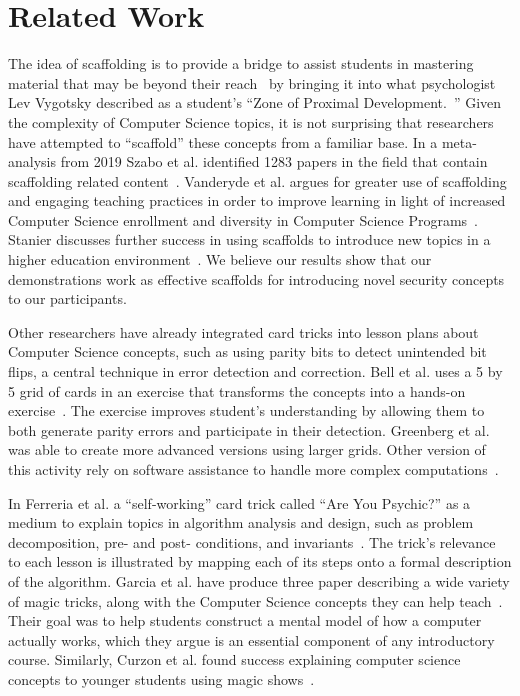 \section{Related Work}
\label{SEC:related-work}

The idea of scaffolding is to provide a bridge to assist students
in mastering material that may be beyond their reach~\cite{wood1976role}
by bringing it into what psychologist Lev Vygotsky described as a student's
``Zone of Proximal Development.~\cite{vygotsky1978}''  Given the complexity of Computer Science
topics, it is not surprising that researchers have attempted to ``scaffold''
these concepts from a familiar base.  In a meta-analysis from 2019 Szabo et al.
identified 1283 papers in the field that contain scaffolding related
content~\cite{szabometa}.
Vanderyde et al. argues for greater use of scaffolding and engaging teaching
practices in order to improve learning in light of increased Computer Science
enrollment and diversity in Computer Science
Programs~\cite{vanderhydescaffolding}.  Stanier discusses
further success in using scaffolds to introduce new topics in a higher education
environment~\cite{stanierhighered}.
We believe our results show that our demonstrations work as
effective scaffolds for introducing novel security concepts to our participants.

Other researchers have already integrated card tricks into lesson plans about
Computer Science concepts, such as using parity bits to detect unintended bit
flips, a central technique in error detection and correction.  Bell et al. uses a
5 by 5 grid of cards in an exercise that transforms the concepts into a hands-on
exercise~\cite{bell2009computer, csunplugged}.
The exercise improves student's understanding by allowing them to
both generate parity errors and participate in their detection.  Greenberg et
al. was able to create more advanced versions using larger grids.  Other version
of this activity rely on software assistance to handle more complex
computations~\cite{Greenberg2017, Greenberg2018}.

In Ferreria et al. a ``self-working'' card trick called ``Are You Psychic?''
as a medium to explain topics in algorithm analysis and design, such as problem
decomposition, pre- and post- conditions, and
invariants~\cite{ferreira2014magic}.
The trick's relevance
to each lesson is illustrated by mapping each of its steps onto a formal
description of the algorithm.  Garcia et al. have produce three paper describing
a wide variety of magic tricks, along with the Computer Science concepts they
can help teach~\cite{garcia2012demystifying,
garcia2013demystifying,
garcia2016demystifying}.
Their goal was to help students construct a mental model of how
a computer actually works, which they argue is an essential component of any
introductory course.  Similarly, Curzon et al. found success explaining computer
science concepts to younger students using magic shows~\cite{curzon2008engaging}.


